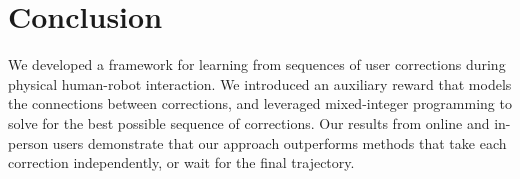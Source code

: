 \section{Conclusion}
\label{discussion}

We developed a framework for learning from sequences of user corrections during physical human-robot interaction. We introduced an auxiliary reward that models the connections between corrections, and leveraged mixed-integer programming to solve for the best possible sequence of corrections. Our results from online and in-person users demonstrate that our approach outperforms methods that take each correction independently, or wait for the final trajectory.
